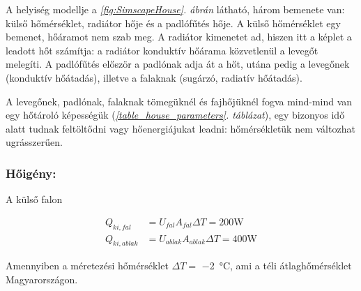 A helyiség modellje a \textit{\ref{fig:SimscapeHouse}. ábrán} látható, három bemenete van: külső hőmérséklet, radiátor hője és a padlófűtés hője.
A külső hőmérséklet egy  bemenet, hőáramot nem szab meg.
A radiátor  kimenetet ad, hiszen itt a képlet a leadott hőt számítja: a radiátor konduktív hőárama közvetlenül a levegőt melegíti. A padlófűtés először a padlónak adja át a hőt, utána pedig a levegőnek (konduktív hőátadás), illetve a falaknak (sugárzó, radiatív hőátadás).

A levegőnek, padlónak, falaknak tömegüknél és fajhőjüknél fogva mind-mind van egy hőtároló képességük (\textit{\ref{table_house_parameters}. táblázat}), egy bizonyos idő alatt tudnak feltöltődni vagy hőenergiájukat leadni: hőmérsékletük nem változhat ugrásszerűen. %


\begin{table}[H]
	\footnotesize
	\centering
	\caption{A helyiség modelljének elemei}
	\renewcommand{\arraystretch}{2} %
	
	
	
	
	
	\label{table_house_parameters}
	
	
\end{table}



\subsubsection*{Hőigény:}

A külső falon

\begin{equation}\label{eq_hoigeny}
\begin{aligned}
		Q_{ki,fal} &= U_{fal}A_{fal}\Delta T = 200\si{\watt}\\[10pt]
		Q_{ki,ablak} &= U_{ablak}A_{ablak}\Delta T = 400\si{\watt}
\end{aligned}
\end{equation}

Amennyiben a méretezési hőmérséklet $\Delta T=$ \SI{-2}{\celsius}, ami a téli átlaghőmérséklet Magyarországon.



